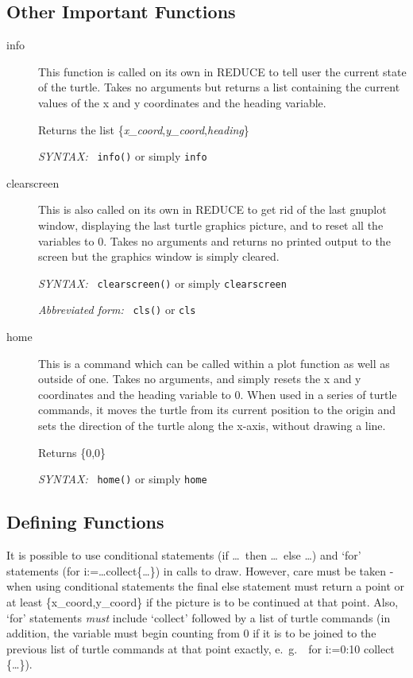 \documentclass[11pt]{article}
\newcommand{\syntax}{\textsl{SYNTAX: }}
\newcommand{\abb}{\textsl{Abbreviated form: }}
\begin{document}
\subsection{Other Important Functions}
\begin{description}
 \item[info] This function is called on its own in {\small REDUCE} to tell
       user the current state of the turtle. Takes no arguments but
       returns a list containing the current values of the x and y
       coordinates and the heading variable.

       Returns the list \{{\it x\_coord},{\it y\_coord},{\it heading}\}

       \syntax\ {\tt info()} or simply {\tt info}
 \item[clearscreen] This is also called on its own in {\small REDUCE} to
       get rid of the last gnuplot window, displaying the last turtle
       graphics picture, and to reset all the variables to 0. Takes no
       arguments and returns no printed output to the screen but the
       graphics window is simply cleared.

       \syntax\ {\tt clearscreen()} or simply {\tt clearscreen}

       \abb\ {\tt cls()} or {\tt cls}
 \item[home] This is a command which can be called within a plot function
       as well as outside of one. Takes no arguments, and simply resets
       the x and y coordinates and the heading variable to 0. When used in 
       a series of turtle commands, it moves the turtle from its current
       position to the origin and sets the direction of the turtle along
       the x-axis, without drawing a line.

       Returns \{0,0\}

       \syntax\ {\tt home()} or simply {\tt home}
\end{description}

\subsection{Defining Functions}

  It is possible to use conditional statements (if \ldots\ then \ldots\
else \ldots) and `for' statements (for i:=\ldots collect\{\ldots\}) in
calls to draw. However, care must be taken - when using conditional
statements the final else statement must return a point or at least
\{x\_coord,y\_coord\} if the picture is to be continued at that point.
Also, `for' statements {\em must} include `collect' followed by a list of
turtle commands (in addition, the variable must begin counting from 0 if
it is to be joined to the previous list of turtle commands at that point
exactly, e.\ g.\ \ for i:=0:10 collect \{\ldots\}).
\end{document}
